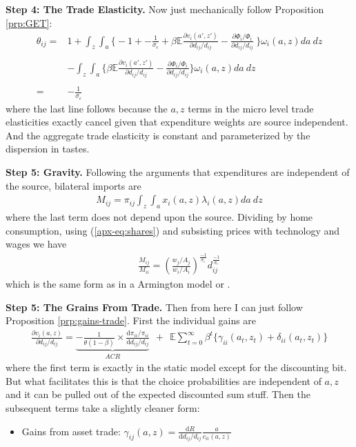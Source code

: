 \documentclass[12pt,pdftex]{article}
\begin{document}
\begin{onehalfspacing}
\textbf{Step 4: The Trade Elasticity.} Now just mechanically follow Proposition \ref{prp:GET}:
\begin{align}
\nonumber
\theta_{ij} =& 1 + \int_{z}\int_{a} \bigg \{ -1 +  -\frac{1}{\sigma_{\epsilon}} + \beta \mathbb{E} \frac{\partial v_{i}(a',z')}{\partial d_{ij}/d_{ij}} -  \frac{\partial \Phi_{i} / \Phi_{i}}{\partial d_{ij}/d_{ij}} \  \bigg \}\omega_{i}(a,z)da \ dz \\
\nonumber \\
& - \int_{z}\int_{a} \bigg \{   \beta \mathbb{E} \frac{\partial v_{i}(a',z')}{\partial d_{ij}/d_{ij}} -  \frac{\partial \Phi_{i} / \Phi_{i}}{\partial d_{ij}/d_{ij}}  \bigg \}\omega_{i}(a,z)da \ dz \\
\nonumber \\
= & -\frac{1}{\sigma_{\epsilon}} \nonumber
\end{align}
where the last line follows because the $a,z$ terms in the micro level trade elasticities exactly cancel given that expenditure weights are source independent. And the aggregate trade elasticity is constant and parameterized by the dispersion in tastes.

\textbf{Step 5: Gravity.} Following the arguments that expenditures are independent of the source, bilateral imports are
\begin{align}
M_{ij} = \pi_{ij} \int_{z}\int_{a} x_{i}(a,z) \lambda_{i}(a,z)da \ dz
\end{align}
where the last term does not depend upon the source. Dividing by home consumption, using (\ref{apx-eq:shares}) and subsisting prices with technology and wages we have
\begin{align}
\frac{M_{ij}}{M_{ii}} = \left( \frac{  w_{j} / A_{j} }{  w_{i} / A_{i} } \right)^{\frac{-1}{\sigma_{\epsilon}}} d_{ij}^{\frac{-1}{\sigma_{\epsilon}}}
\end{align}
which is the same form as in a Armington model or \citet{eaton2002technology}.

\textbf{Step 5: The Grains From Trade.} Then from here I can just follow Proposition \ref{prp:gains-trade}. First the individual gains are
{\footnotesize
\begin{align}
\nonumber
\frac{\partial v_i(a, z)}{\partial d_{ij} / d_{ij}} = \underbrace{-\frac{1}{\theta (1-\beta)} \times \frac{\mathrm{d} \pi_{ii} / \pi_{ii}}{\mathrm{d}d_{ij} / d_{ij}}}_{ACR} \ \ + \ \
\mathbb{E} \sum_{t = 0}^{\infty} \beta^{t} \bigg \{ \gamma_{ii}(a_{t},z_{t}) + \delta_{ii}(a_{t},z_{t}) \bigg \}
\end{align}
}where the first term is exactly in the static model except for the discounting bit. But what facilitates this is that the choice probabilities are independent of $a,z$ and it can be pulled out of the expected discounted sum stuff. Then the subsequent terms take a slightly cleaner form:
\begin{itemize}
\item Gains from asset trade: $\gamma_{ij}(a,z) = \frac{\mathrm{d} R}{\mathrm{d} d_{ij} / d_{ij}}\frac{a}{c_{ii}(a,z)}$
\end{itemize}


\end{onehalfspacing}
\end{document}
